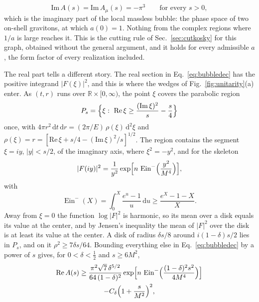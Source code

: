 \documentclass[a4paper,11pt]{article}
\newcommand{\bR}{\mathbb{R}}
\newcommand{\dd}{\mathrm{d}}
\newcommand{\Ein}{\operatorname{Ein}}
\begin{document}
\begin{equation}
\label{eq:bubbleIm}
\mathrm{Im}\,A(s)=\mathrm{Im}\,A_\mu(s)=-\pi^3\qquad\text{for every }s>0 ,
\end{equation}
which is the imaginary part of the local massless bubble: the phase space of two on-shell gravitons, at which $a(0)=1$. Nothing from the complex regions where $1/a$ is large reaches it. This is the cutting rule of Sec.~\ref{sec:cutkosky} for this graph, obtained without the general argument, and it holds for every admissible $a$, the form factor of every realization included.

The real part tells a different story. The real section in Eq.~\eqref{eq:bubbledec} has the positive integrand $|F(\xi)|^2$, and this is where the wedges of Fig.~\ref{fig:unitarity}(a) enter. As $(t,r)$ runs over $\bR\times[0,\infty)$, the point $\xi$ covers the parabolic region
\[
P_s=\Bigl\{\xi:\ \mathrm{Re}\,\xi\ge\frac{(\mathrm{Im}\,\xi)^2}s-\frac s4\Bigr\}
\]
once, with $4\pi r^2\,\dd t\,\dd r=(2\pi/E)\,\rho(\xi)\,\dd^2\xi$ and $\rho(\xi)=r=[\mathrm{Re}\,\xi+s/4-(\mathrm{Im}\,\xi)^2/s]^{1/2}$. The region contains the segment $\xi=iy$, $|y|<s/2$, of the imaginary axis, where $\xi^2=-y^2$, and for the skeleton
\[
|F(iy)|^2=\frac{1}{y^2}\exp\Bigl[n\,\Ein^-\Bigl(\frac{y^2}{M^4}\Bigr)\Bigr],
\]
with
\[
\Ein^-(X)=\int_0^X\frac{e^u-1}u\,\dd u\ge\frac{e^X-1-X}X .
\]
Away from $\xi=0$ the function $\log|F|^2$ is harmonic, so its mean over a disk equals its value at the center, and by Jensen's inequality the mean of $|F|^2$ over the disk is at least its value at the center. A disk of radius $\delta s/8$ around $i(1-\delta)s/2$ lies in $P_s$, and on it $\rho^2\ge7\delta s/64$. Bounding everything else in Eq.~\eqref{eq:bubbledec} by a power of $s$ gives, for $0<\delta<\frac12$ and $s\ge6M^2$,
\begin{multline}
\label{eq:bubblebound}
\mathrm{Re}\,A(s)\ge\frac{\pi^2\sqrt7\,\delta^{5/2}}{64\,(1-\delta)^2}\exp\Bigl[n\,\Ein^-\Bigl(\frac{(1-\delta)^2s^2}{4M^4}\Bigr)\Bigr]\\
-C_\delta\Bigl(1+\frac s{M^2}\Bigr)^{2},
\end{multline}
\end{document}
